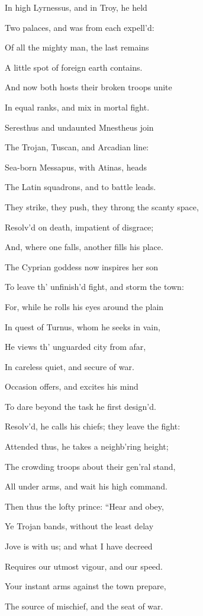 In high Lyrnessus, and in Troy, he held

Two palaces, and was from each expell’d:

Of all the mighty man, the last remains

A little spot of foreign earth contains.

And now both hosts their broken troops unite

In equal ranks, and mix in mortal fight.

Seresthus and undaunted Mnestheus join

The Trojan, Tuscan, and Arcadian line:

Sea-born Messapus, with Atinas, heads

The Latin squadrons, and to battle leads.

They strike, they push, they throng the scanty space,

Resolv’d on death, impatient of disgrace;

And, where one falls, another fills his place.

The Cyprian goddess now inspires her son

To leave th’ unfinish’d fight, and storm the town:

For, while he rolls his eyes around the plain

In quest of Turnus, whom he seeks in vain,

He views th’ unguarded city from afar,

In careless quiet, and secure of war.

Occasion offers, and excites his mind

To dare beyond the task he first design’d.

Resolv’d, he calls his chiefs; they leave the fight:

Attended thus, he takes a neighb’ring height;

The crowding troops about their gen’ral stand,

All under arms, and wait his high command.

Then thus the lofty prince: “Hear and obey,

Ye Trojan bands, without the least delay

Jove is with us; and what I have decreed

Requires our utmost vigour, and our speed.

Your instant arms against the town prepare,

The source of mischief, and the seat of war.

